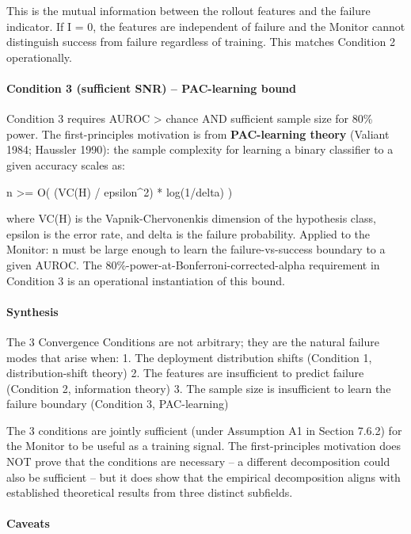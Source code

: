 \documentclass[11pt]{article}
\begin{document}
This is the mutual information between the rollout features and the
failure indicator. If I = 0, the features are independent of failure and
the Monitor cannot distinguish success from failure regardless of
training. This matches Condition 2 operationally.

\paragraph{Condition 3 (sufficient SNR) -- PAC-learning
bound}\label{condition-3-sufficient-snr-pac-learning-bound}

Condition 3 requires AUROC \textgreater{} chance AND sufficient sample
size for 80\% power. The first-principles motivation is from
\textbf{PAC-learning theory} (Valiant 1984; Haussler 1990): the sample
complexity for learning a binary classifier to a given accuracy scales
as:

n \textgreater= O( (VC(H) / epsilon\^{}2) * log(1/delta) )

where VC(H) is the Vapnik-Chervonenkis dimension of the hypothesis
class, epsilon is the error rate, and delta is the failure probability.
Applied to the Monitor: n must be large enough to learn the
failure-vs-success boundary to a given AUROC. The
80\%-power-at-Bonferroni-corrected-alpha requirement in Condition 3 is
an operational instantiation of this bound.

\paragraph{Synthesis}\label{synthesis}

The 3 Convergence Conditions are not arbitrary; they are the natural
failure modes that arise when: 1. The deployment distribution shifts
(Condition 1, distribution-shift theory) 2. The features are
insufficient to predict failure (Condition 2, information theory) 3. The
sample size is insufficient to learn the failure boundary (Condition 3,
PAC-learning)

The 3 conditions are jointly sufficient (under Assumption A1 in Section
7.6.2) for the Monitor to be useful as a training signal. The
first-principles motivation does NOT prove that the conditions are
necessary -- a different decomposition could also be sufficient -- but
it does show that the empirical decomposition aligns with established
theoretical results from three distinct subfields.

\paragraph{Caveats}\label{caveats}
\end{document}
